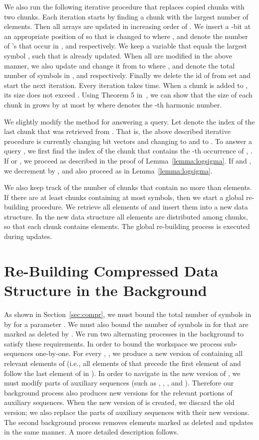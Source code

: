 \documentclass[11pt]{article}\usepackage{fullpage}
\begin{document}
We also run the following iterative procedure that replaces copied chunks with two chunks. Each iteration starts by finding a chunk  with the largest number of elements. Then all arrays  are updated in increasing order of . We insert a -bit at an appropriate position of  so that  is changed to  where ,  and  denote the number of 's that occur in ,  and  respectively. We keep a variable  that equals the largest symbol , such that  is already updated. When all  are modified in the above manner, we also update  and change it from  to  where ,  and  denote the total number of symbols in ,  and  respectively. Finally we delete the id of  from 
 set  and start the next iteration.  Every iteration takes  time.  When a chunk is added to , its size does not exceed . Using Theorem 5 in~\cite{DietzS87}, we can show that the size of each chunk in  grows by at most by  where  denotes the -th harmonic number. 

We slightly modify the method for answering a  query. 
Let  denote the index of the last chunk that was retrieved from . That is, the above described iterative procedure is currently changing bit vectors  and  changing 
 to  and 
 to .
To answer a query , we first find the index 
of the chunk  that contains the -th occurrence of ,
. 
If  or , we proceed as described in the proof of Lemma~\ref{lemma:logsigma}.  
If  and , we decrement  by ,  and also proceed as in Lemma~\ref{lemma:logsigma}. 


We also keep track of the number of chunks that contain no more than   elements. If there are at least  chunks containing at most  symbols, then we start a global re-building procedure. We retrieve all elements of  and insert them into a new data structure. In the new data structure all elements are distributed among chunks, so that each chunk contains  elements. The global re-building process is executed during  updates. 



\section{Re-Building  Compressed Data Structure in the Background}
\label{sec:updatesbackground}
As shown in Section~\ref{sec:compr}, we must bound the total number of symbols in  by  for a parameter . 
We must also bound the number of symbols in  for 
that are marked as deleted by . 
We run two alternating processes in the background to satisfy these requirements.
 In order to bound the workspace we process sub-sequences  one-by-one. For every , , we produce a new version  of  containing  all relevant  elements of  (i.e., all elements of  that precede the first element of 
 and follow the last element of  in ). 
In order to navigate in the new version of , we must modify parts of auxiliary sequences (such as , , , and ). Therefore our background process also produces new versions for the relevant portions of auxiliary sequences. When the new version of  is created, we discard the old version; we also replace the parts of auxiliary sequences with their new versions.  The second background process removes elements marked as deleted and updates  in the same manner. A more detailed description follows. 
\end{document}
